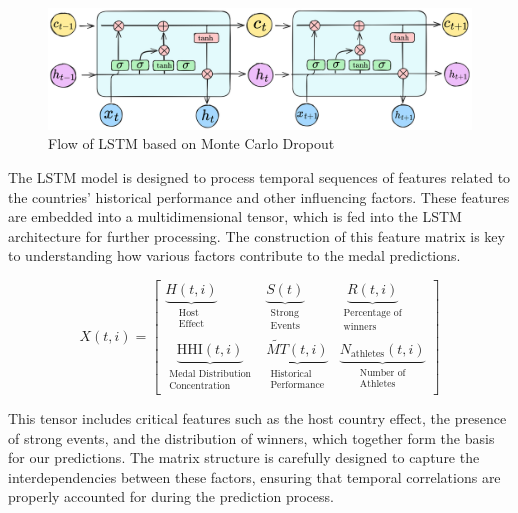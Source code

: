 \documentclass{mcmthesis}
\newenvironment{featurebox}[1]{%
	\begin{tcolorbox}[
		colback=white,                  %
		colframe=customblue,            %
		colbacktitle=customblue,        %
		coltitle=deepblue,              %
		arc=3mm,                        %
		boxrule=1.5pt,                  %
		title={\large\bfseries #1},     %
		fonttitle=\sffamily,            %
		top=10pt,                       %
		bottom=10pt,                    %
		left=10pt,                      %
		right=10pt,                     %
		]
	}{\end{tcolorbox}}
\begin{document}
	\begin{figure}[H]
		\centering
		\includegraphics[width=1\linewidth]{fig/LSTM2.png}
		\caption{Flow of LSTM based on Monte Carlo Dropout}
		\label{fig:LSTM}
	\end{figure}
	The LSTM model is designed to process temporal sequences of features related to the countries' historical performance and other influencing factors. These features are embedded into a multidimensional tensor, which is fed into the LSTM architecture for further processing. The construction of this feature matrix is key to understanding how various factors contribute to the medal predictions.
\begin{featurebox}{Multidimensional Tensor Construction}
	\[
	X(t,i) = \begin{bmatrix}
		\underbrace{H(t,i)}_{\substack{\text{Host}\\ \text{Effect}}} & 
		\underbrace{S(t)}_{\substack{\text{Strong}\\ \text{Events}}} & 
		\underbrace{R(t,i)}_{\substack{\text{Percentage of}\\ \text{winners}}} \\[2ex] %
		\underbrace{\text{HHI}(t,i)}_{\substack{\text{Medal Distribution}\\ \text{Concentration}}} & 
		\underbrace{\widetilde{MT}(t,i)}_{\substack{\text{Historical}\\ \text{Performance}}} &
		\underbrace{N_{\text{athletes}}(t,i)}_{\substack{\text{Number of}\\ \text{Athletes}}}
	\end{bmatrix}
	\]
\end{featurebox}
This tensor includes critical features such as the host country effect, the presence of strong events, and the distribution of winners, which together form the basis for our predictions. The matrix structure is carefully designed to capture the interdependencies between these factors, ensuring that temporal correlations are properly accounted for during the prediction process.
\end{document}
